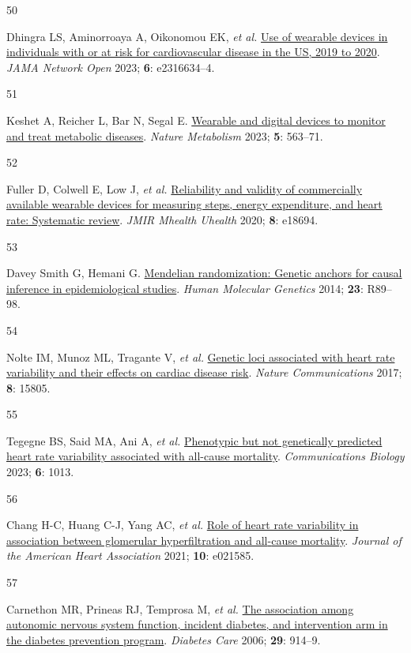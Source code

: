 \documentclass[
  a4paper,
  headsepline=true,
  open=any]{scrbook}
\newlength{\cslhangindent}
\newlength{\csllabelwidth}
\newlength{\cslentryspacingunit} %
\newenvironment{CSLReferences}[2] %
 {%
  \setlength{\parindent}{0pt}
  \ifodd #1
  \let\oldpar\par
  \def\par{\hangindent=\cslhangindent\oldpar}
  \fi
  \setlength{\parskip}{#2\cslentryspacingunit}
 }%
 {}
\newcommand{\CSLLeftMargin}[1]{\parbox[t]{\csllabelwidth}{#1}}
\newcommand{\CSLRightInline}[1]{\parbox[t]{\linewidth - \csllabelwidth}{#1}\break}
\begin{document}
\begin{CSLReferences}{0}{0}
\leavevmode{}%
\CSLLeftMargin{50 }%
\CSLRightInline{Dhingra LS, Aminorroaya A, Oikonomou EK, \emph{et al.}
\href{https://doi.org/10.1001/jamanetworkopen.2023.16634}{Use of
wearable devices in individuals with or at risk for cardiovascular
disease in the US, 2019 to 2020}. \emph{JAMA Network Open} 2023;
\textbf{6}: e2316634--4.}

\leavevmode{}%
\CSLLeftMargin{51 }%
\CSLRightInline{Keshet A, Reicher L, Bar N, Segal E.
\href{https://doi.org/10.1038/s42255-023-00778-y}{Wearable and digital
devices to monitor and treat metabolic diseases}. \emph{Nature
Metabolism} 2023; \textbf{5}: 563--71.}

\leavevmode{}%
\CSLLeftMargin{52 }%
\CSLRightInline{Fuller D, Colwell E, Low J, \emph{et al.}
\href{https://doi.org/10.2196/18694}{Reliability and validity of
commercially available wearable devices for measuring steps, energy
expenditure, and heart rate: Systematic review}. \emph{JMIR Mhealth
Uhealth} 2020; \textbf{8}: e18694.}

\leavevmode{}%
\CSLLeftMargin{53 }%
\CSLRightInline{Davey Smith G, Hemani G.
\href{https://doi.org/10.1093/hmg/ddu328}{Mendelian randomization:
Genetic anchors for causal inference in epidemiological studies}.
\emph{Human Molecular Genetics} 2014; \textbf{23}: R89--98.}

\leavevmode{}%
\CSLLeftMargin{54 }%
\CSLRightInline{Nolte IM, Munoz ML, Tragante V, \emph{et al.}
\href{https://doi.org/10.1038/ncomms15805}{Genetic loci associated with
heart rate variability and their effects on cardiac disease risk}.
\emph{Nature Communications} 2017; \textbf{8}: 15805.}

\leavevmode{}%
\CSLLeftMargin{55 }%
\CSLRightInline{Tegegne BS, Said MA, Ani A, \emph{et al.}
\href{https://doi.org/10.1038/s42003-023-05376-y}{Phenotypic but not
genetically predicted heart rate variability associated with all-cause
mortality}. \emph{Communications Biology} 2023; \textbf{6}: 1013.}

\leavevmode{}%
\CSLLeftMargin{56 }%
\CSLRightInline{Chang H-C, Huang C-J, Yang AC, \emph{et al.}
\href{https://doi.org/10.1161/JAHA.121.021585}{Role of heart rate
variability in association between glomerular hyperfiltration and
all{-}cause mortality}. \emph{Journal of the American Heart Association}
2021; \textbf{10}: e021585.}

\leavevmode{}%
\CSLLeftMargin{57 }%
\CSLRightInline{Carnethon MR, Prineas RJ, Temprosa M, \emph{et al.}
\href{https://doi.org/10.2337/diacare.29.04.06.dc05-1729}{The
association among autonomic nervous system function, incident diabetes,
and intervention arm in the diabetes prevention program}. \emph{Diabetes
Care} 2006; \textbf{29}: 914--9.}

\end{CSLReferences}
\end{document}
